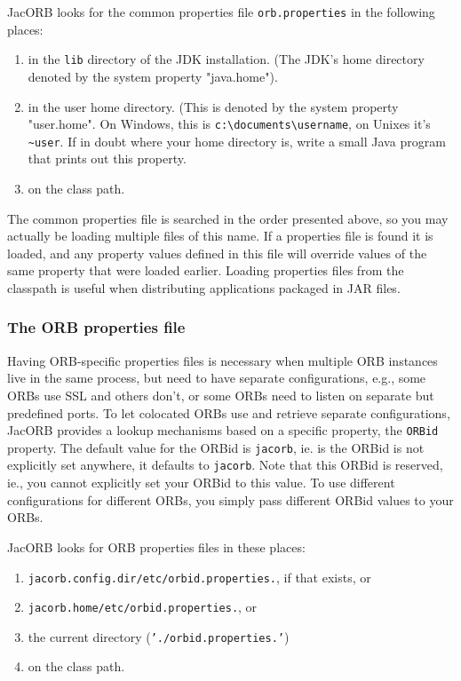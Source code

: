 JacORB looks for the common properties file {\tt orb.properties} in
the following places:

\begin{enumerate}
\item in the {\tt lib} directory of the JDK installation. (The JDK's
  home directory denoted by the system property "java.home").
\item in the user home directory. (This is denoted by the system
    property "user.home". On Windows, this is
    {\verb+c:\documents\username+}, on Unixes it's {\verb+~user+}. If
    in doubt where your home directory is, write a small Java program that
  prints out this property.
\item on the class path.
\end{enumerate}

The common properties file is searched in the order presented above,
so you may actually be loading multiple files of this name. If a
properties file is found it is loaded, and any property values defined
in this file will override values of the same property that were
loaded earlier. Loading properties files from the classpath is useful
when distributing applications packaged in JAR files.

\subsubsection{The ORB properties file}

Having ORB-specific properties files is necessary when multiple ORB
instances live in the same process, but need to have separate
configurations, e.g., some ORBs use SSL and others don't, or some ORBs
need to listen on separate but predefined ports. To let colocated ORBs
use and retrieve separate configurations, JacORB provides a lookup
mechanisms based on a specific property, the {\tt ORBid} property. The
default value for the ORBid is {\tt jacorb}, ie. is the ORBid is not
explicitly set anywhere, it defaults to {\tt jacorb}. Note that this
ORBid is reserved, ie., you cannot explicitly set your ORBid to this
value. To use different configurations for different ORBs, you simply
pass different ORBid values to your ORBs.

JacORB looks for ORB properties files in these places:

\begin{enumerate}
\item {\tt jacorb.config.dir/etc/orbid.properties.}, if that exists, or
\item {\tt jacorb.home/etc/orbid.properties.}, or
\item the current directory ({\tt './orbid.properties.'})
\item on the class path.
\end{enumerate}

